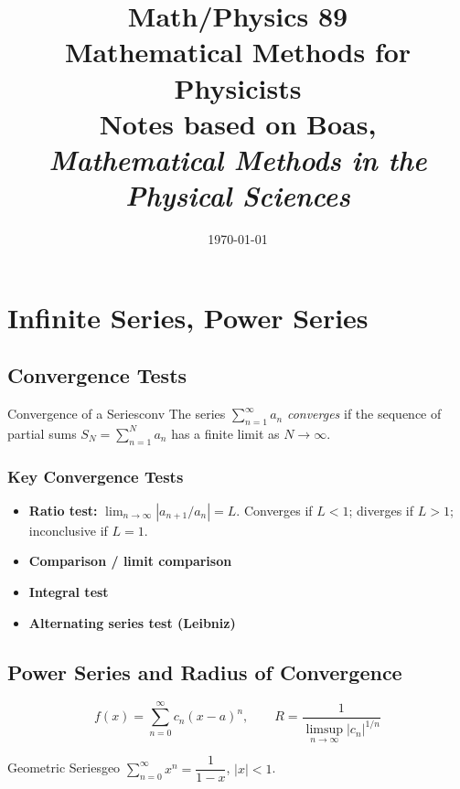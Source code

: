 \documentclass[11pt, letterpaper]{article}
\title{%
  \textbf{Math/Physics 89}\\[4pt]
  \large Mathematical Methods for Physicists\\[2pt]
  \normalsize Notes based on Boas, \textit{Mathematical Methods in the Physical Sciences}
}
\author{}
\date{\today}
\theoremstyle{plain}
\begin{document}

\maketitle
\tableofcontents
\newpage


\section{Infinite Series, Power Series}   %

\subsection{Convergence Tests}

\begin{definition}{Convergence of a Series}{conv}
  The series $\sum_{n=1}^\infty a_n$ \emph{converges} if the sequence of
  partial sums $S_N = \sum_{n=1}^N a_n$ has a finite limit as $N\to\infty$.
\end{definition}

\subsubsection*{Key Convergence Tests}
\begin{itemize}
  \item \textbf{Ratio test:} $\lim_{n\to\infty}|a_{n+1}/a_n| = L$.
        Converges if $L<1$; diverges if $L>1$; inconclusive if $L=1$.
  \item \textbf{Comparison / limit comparison}
  \item \textbf{Integral test}
  \item \textbf{Alternating series test (Leibniz)}
\end{itemize}

\subsection{Power Series and Radius of Convergence}

\[
  f(x) = \sum_{n=0}^\infty c_n (x - a)^n, \qquad
  R = \frac{1}{\displaystyle\limsup_{n\to\infty} |c_n|^{1/n}}
\]

\begin{example}{Geometric Series}{geo}
  $\sum_{n=0}^\infty x^n = \dfrac{1}{1-x}$, \quad $|x|<1$.
\end{example}
\end{document}
